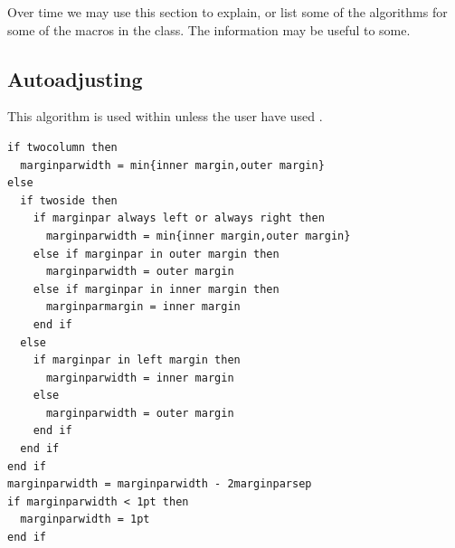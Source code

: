 \documentclass[10pt,a4paper,extrafontsizes]{memoir}
\newcommand{\PWnote}[2]{}
\begin{document}
Over time we may use this section to explain, or list some of the
algorithms for some of the macros in the class. The information may be
useful to some.

\subsection{Autoadjusting
  \texorpdfstring{}{\textbackslash marginparwidth}}
\label{sec:auto-csmarg}

This algorithm is used within \cmd{\fixthelayout} unless the user have
used \cmd{\setmarginnotes}.

\noindent
\begin{framed}
  \baselineskip
  \begin{small}
\begin{verbatim}
if twocolumn then
  marginparwidth = min{inner margin,outer margin}
else
  if twoside then
    if marginpar always left or always right then
      marginparwidth = min{inner margin,outer margin}
    else if marginpar in outer margin then
      marginparwidth = outer margin
    else if marginpar in inner margin then
      marginparmargin = inner margin
    end if
  else
    if marginpar in left margin then
      marginparwidth = inner margin
    else
      marginparwidth = outer margin
    end if
  end if
end if
marginparwidth = marginparwidth - 2marginparsep
if marginparwidth < 1pt then
  marginparwidth = 1pt
end if
\end{verbatim}
  \end{small}
\end{framed}







\backmatter

\PWnote{2009/07/08}{Changed \cs{toclevel@section} so that Notes 
                    divisions appear in the bookmarks}
\makeatletter\renewcommand*{\toclevel@chapter}{-1}\makeatother 
\makeatletter\renewcommand*{\toclevel@section}{0}\makeatother
\clearpage
\printpagenotes
\clearpage
\pagestyle{plainmarkruled}

\renewcommand*{\begintheglossaryhook}{\small}
\printglossary
\end{document}
